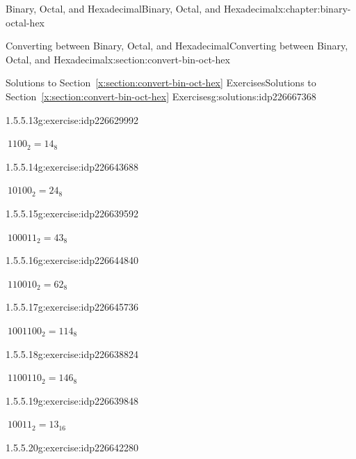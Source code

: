 \documentclass[twoside,10pt,]{book}
\newcommand{\xreffont}{\relax}
\numberwithin{equation}{section}
\begin{document}
\begin{chapterptx}{Binary, Octal, and Hexadecimal}{}{Binary, Octal, and Hexadecimal}{}{}{x:chapter:binary-octal-hex}
\begin{sectionptx}{Converting between Binary, Octal, and Hexadecimal}{}{Converting between Binary, Octal, and Hexadecimal}{}{}{x:section:convert-bin-oct-hex}
\begin{solutions-subsection}{Solutions to Section~{\xreffont\ref*{x:section:convert-bin-oct-hex}} Exercises}{}{Solutions to Section~{\xreffont\ref*{x:section:convert-bin-oct-hex}} Exercises}{}{}{g:solutions:idp226667368}
\begin{exercisegroup}
\end{exercisegroup}
\par\medskip\noindent
\begin{exercisegroup}
\begin{divisionsolutioneg}{1.5.5.13}{}{g:exercise:idp226629992}%
\par\smallskip%
\noindent\hypertarget{g:solution:idp226638952-main}{}\(\ 1100_2=14_8\)\end{divisionsolutioneg}%
\begin{divisionsolutioneg}{1.5.5.14}{}{g:exercise:idp226643688}%
\par\smallskip%
\noindent\hypertarget{g:solution:idp226639336-main}{}\(\ 10100_2=24_8\)\end{divisionsolutioneg}%
\begin{divisionsolutioneg}{1.5.5.15}{}{g:exercise:idp226639592}%
\par\smallskip%
\noindent\hypertarget{g:solution:idp226640360-main}{}\(\ 100011_2=43_8\)\end{divisionsolutioneg}%
\begin{divisionsolutioneg}{1.5.5.16}{}{g:exercise:idp226644840}%
\par\smallskip%
\noindent\hypertarget{g:solution:idp226645992-main}{}\(\ 110010_2=62_8\)\end{divisionsolutioneg}%
\begin{divisionsolutioneg}{1.5.5.17}{}{g:exercise:idp226645736}%
\par\smallskip%
\noindent\hypertarget{g:solution:idp226638696-main}{}\(\ 1001100_2=114_8\)\end{divisionsolutioneg}%
\begin{divisionsolutioneg}{1.5.5.18}{}{g:exercise:idp226638824}%
\par\smallskip%
\noindent\hypertarget{g:solution:idp226642536-main}{}\(\ 1100110_2=146_8\)\end{divisionsolutioneg}%
\end{exercisegroup}
\par\medskip\noindent
\begin{exercisegroup}
\begin{divisionsolutioneg}{1.5.5.19}{}{g:exercise:idp226639848}%
\par\smallskip%
\noindent\hypertarget{g:solution:idp226643816-main}{}\(\ 10011_2=13_{16}\)\end{divisionsolutioneg}%
\begin{divisionsolutioneg}{1.5.5.20}{}{g:exercise:idp226642280}%
\par\smallskip%

\end{divisionsolutioneg}
\end{exercisegroup}
\end{solutions-subsection}
\end{sectionptx}
\end{chapterptx}
\end{document}
